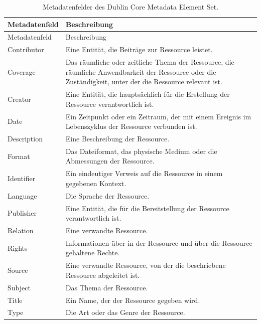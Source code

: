 \documentclass[
  nswissgerman,
  letterpaper,
  DIV=11,
  numbers=noendperiod]{scrartcl}
\begin{document}
\begin{longtable}[]{@{}
  >{\raggedright\arraybackslash}p{}
  >{\raggedright\arraybackslash}p{}@{}}
\caption{Metadatenfelder des Dublin Core Metadata Element
Set.}\tabularnewline
\toprule\noalign{}
\begin{minipage}[b]{\linewidth}\raggedright
Metadatenfeld
\end{minipage} & \begin{minipage}[b]{\linewidth}\raggedright
Beschreibung
\end{minipage} \\
\midrule\noalign{}
\endfirsthead
\toprule\noalign{}
\begin{minipage}[b]{\linewidth}\raggedright
Metadatenfeld
\end{minipage} & \begin{minipage}[b]{\linewidth}\raggedright
Beschreibung
\end{minipage} \\
\midrule\noalign{}
\endhead
\bottomrule\noalign{}
\endlastfoot
Contributor & Eine Entität, die Beiträge zur Ressource leistet. \\
Coverage & Das räumliche oder zeitliche Thema der Ressource, die
räumliche Anwendbarkeit der Ressource oder die Zuständigkeit, unter der
die Ressource relevant ist. \\
Creator & Eine Entität, die hauptsächlich für die Erstellung der
Ressource verantwortlich ist. \\
Date & Ein Zeitpunkt oder ein Zeitraum, der mit einem Ereignis im
Lebenszyklus der Ressource verbunden ist. \\
Description & Eine Beschreibung der Ressource. \\
Format & Das Dateiformat, das physische Medium oder die Abmessungen der
Ressource. \\
Identifier & Ein eindeutiger Verweis auf die Ressource in einem
gegebenen Kontext. \\
Language & Die Sprache der Ressource. \\
Publisher & Eine Entität, die für die Bereitstellung der Ressource
verantwortlich ist. \\
Relation & Eine verwandte Ressource. \\
Rights & Informationen über in der Ressource und über die Ressource
gehaltene Rechte. \\
Source & Eine verwandte Ressource, von der die beschriebene Ressource
abgeleitet ist. \\
Subject & Das Thema der Ressource. \\
Title & Ein Name, der der Ressource gegeben wird. \\
Type & Die Art oder das Genre der Ressource. \\
\end{longtable}
\end{document}
